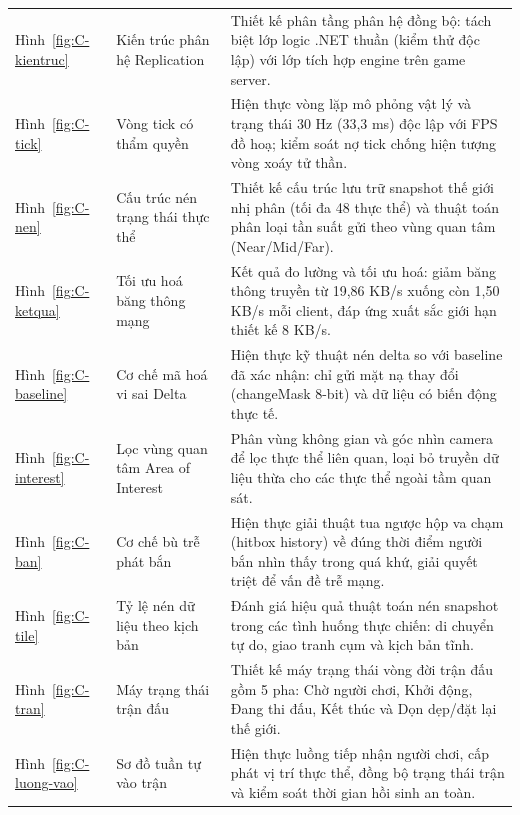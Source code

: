 \begin{center}\small
\begin{tabularx}{\linewidth}{|L{2.2cm}|L{4.2cm}|Y|}
\hline
{} &  &  \\ \hline
Hình~\ref{fig:C-kientruc} & Kiến trúc phân hệ Replication & Thiết kế phân tầng phân hệ đồng bộ: tách biệt lớp logic .NET thuần (kiểm thử độc lập) với lớp tích hợp engine trên game server. \\ \hline
Hình~\ref{fig:C-tick} & Vòng tick có thẩm quyền & Hiện thực vòng lặp mô phỏng vật lý và trạng thái 30 Hz (33,3 ms) độc lập với FPS đồ hoạ; kiểm soát nợ tick chống hiện tượng vòng xoáy tử thần. \\ \hline
Hình~\ref{fig:C-nen} & Cấu trúc nén trạng thái thực thể & Thiết kế cấu trúc lưu trữ snapshot thế giới nhị phân (tối đa 48 thực thể) và thuật toán phân loại tần suất gửi theo vùng quan tâm (Near/Mid/Far). \\ \hline
Hình~\ref{fig:C-ketqua} & Tối ưu hoá băng thông mạng & Kết quả đo lường và tối ưu hoá: giảm băng thông truyền từ 19,86 KB/s xuống còn 1,50 KB/s mỗi client, đáp ứng xuất sắc giới hạn thiết kế 8 KB/s. \\ \hline
Hình~\ref{fig:C-baseline} & Cơ chế mã hoá vi sai Delta & Hiện thực kỹ thuật nén delta so với baseline đã xác nhận: chỉ gửi mặt nạ thay đổi (changeMask 8-bit) và dữ liệu có biến động thực tế. \\ \hline
Hình~\ref{fig:C-interest} & Lọc vùng quan tâm Area of Interest & Phân vùng không gian và góc nhìn camera để lọc thực thể liên quan, loại bỏ truyền dữ liệu thừa cho các thực thể ngoài tầm quan sát. \\ \hline
Hình~\ref{fig:C-ban} & Cơ chế bù trễ phát bắn & Hiện thực giải thuật tua ngược hộp va chạm (hitbox history) về đúng thời điểm người bắn nhìn thấy trong quá khứ, giải quyết triệt để vấn đề trễ mạng. \\ \hline
Hình~\ref{fig:C-tile} & Tỷ lệ nén dữ liệu theo kịch bản & Đánh giá hiệu quả thuật toán nén snapshot trong các tình huống thực chiến: di chuyển tự do, giao tranh cụm và kịch bản tĩnh. \\ \hline
Hình~\ref{fig:C-tran} & Máy trạng thái trận đấu & Thiết kế máy trạng thái vòng đời trận đấu gồm 5 pha: Chờ người chơi, Khởi động, Đang thi đấu, Kết thúc và Dọn dẹp/đặt lại thế giới. \\ \hline
Hình~\ref{fig:C-luong-vao} & Sơ đồ tuần tự vào trận & Hiện thực luồng tiếp nhận người chơi, cấp phát vị trí thực thể, đồng bộ trạng thái trận và kiểm soát thời gian hồi sinh an toàn. \\ \hline

\end{tabularx}
\end{center}
